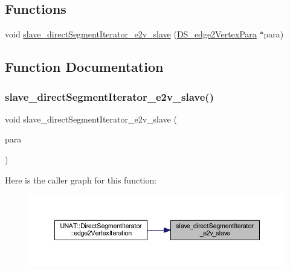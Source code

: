 \subsection*{Functions}
\begin{DoxyCompactItemize}
\item 
void \mbox{\hyperlink{iterator_2directSegmentIterator_2directSegmentIterator_8C_a6f37f216fc5e7f5e590bdf2a9175cd91}{slave\+\_\+direct\+Segment\+Iterator\+\_\+e2v\+\_\+slave}} (\mbox{\hyperlink{structDS__edge2VertexPara}{D\+S\+\_\+edge2\+Vertex\+Para}} $\ast$para)
\end{DoxyCompactItemize}


\subsection{Function Documentation}
\mbox{\label{iterator_2directSegmentIterator_2directSegmentIterator_8C_a6f37f216fc5e7f5e590bdf2a9175cd91}} 
\subsubsection{\texorpdfstring{slave\_directSegmentIterator\_e2v\_slave()}{slave\_directSegmentIterator\_e2v\_slave()}}
{\footnotesize\ttfamily void slave\+\_\+direct\+Segment\+Iterator\+\_\+e2v\+\_\+slave (\begin{DoxyParamCaption}\item[{\mbox{\hyperlink{structDS__edge2VertexPara}{D\+S\+\_\+edge2\+Vertex\+Para}} $\ast$}]{para }\end{DoxyParamCaption})}

Here is the caller graph for this function\+:
\nopagebreak
\begin{figure}[H]
\begin{center}
\leavevmode
\includegraphics[width=350pt]{iterator_2directSegmentIterator_2directSegmentIterator_8C_a6f37f216fc5e7f5e590bdf2a9175cd91_icgraph}
\end{center}
\end{figure}
